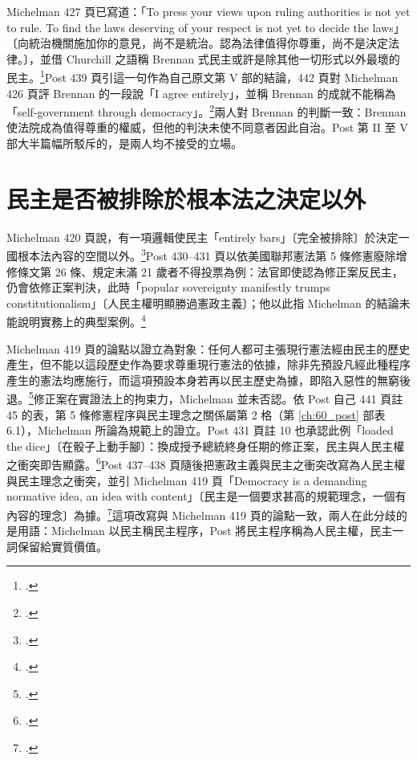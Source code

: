 Michelman 427 頁已寫道：「To press your views upon ruling authorities is not yet to rule. To find the laws deserving of your respect is not yet to decide the laws」〔向統治機關施加你的意見，尚不是統治。認為法律值得你尊重，尚不是決定法律。〕，並借 Churchill 之語稱 Brennan 式民主或許是除其他一切形式以外最壞的民主。\footcite[427]{michelman1998}Post 439 頁引這一句作為自己原文第 V 部的結論，442 頁對 Michelman 426 頁評 Brennan 的一段說「I agree entirely」，並稱 Brennan 的成就不能稱為「self-government through democracy」。\footcite[439, 442]{post1998}兩人對 Brennan 的判斷一致：Brennan 使法院成為值得尊重的權威，但他的判決未使不同意者因此自治。Post 第 II 至 V 部大半篇幅所駁斥的，是兩人均不接受的立場。

\section{民主是否被排除於根本法之決定以外}
\label{sec:70_misreadings-5}

Michelman 420 頁說，有一項邏輯使民主「entirely bars」〔完全被排除〕於決定一國根本法內容的空間以外。\footcite[420]{michelman1998}Post 430--431 頁以依美國聯邦憲法第 5 條修憲廢除增修條文第 26 條、規定未滿 21 歲者不得投票為例：法官即使認為修正案反民主，仍會依修正案判決，此時「popular sovereignty manifestly trumps constitutionalism」〔人民主權明顯勝過憲政主義〕；他以此指 Michelman 的結論未能說明實務上的典型案例。\footcite[430--431]{post1998}

Michelman 419 頁的論點以證立為對象：任何人都可主張現行憲法經由民主的歷史產生，但不能以這段歷史作為要求尊重現行憲法的依據，除非先預設凡經此種程序產生的憲法均應施行，而這項預設本身若再以民主歷史為據，即陷入惡性的無窮後退。\footcite[419]{michelman1998}修正案在實證法上的拘束力，Michelman 並未否認。依 Post 自己 441 頁註 45 的表，第 5 條修憲程序與民主理念之關係屬第 2 格（第 \ref{ch:60_post} 部表 6.1），Michelman 所論為規範上的證立。Post 431 頁註 10 也承認此例「loaded the dice」〔在骰子上動手腳〕：換成授予總統終身任期的修正案，民主與人民主權之衝突即告顯露。\footcite[431 n.10]{post1998}Post 437--438 頁隨後把憲政主義與民主之衝突改寫為人民主權與民主理念之衝突，並引 Michelman 419 頁「Democracy is a demanding normative idea, an idea with content」〔民主是一個要求甚高的規範理念，一個有內容的理念〕為據。\footcite[438]{post1998}這項改寫與 Michelman 419 頁的論點一致，兩人在此分歧的是用語：Michelman 以民主稱民主程序，Post 將民主程序稱為人民主權，民主一詞保留給實質價值。
